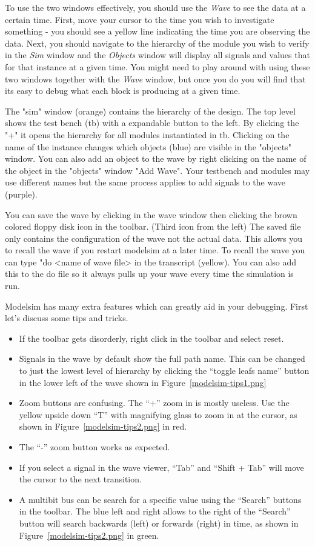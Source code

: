 \documentclass{article}
\begin{document}
To use the two windows effectively, you should use the \textit{Wave}
to see the data at a certain time.  First, move your cursor to the
time you wish to investigate something - you should see a yellow line
indicating the time you are observing the data.  Next, you
should navigate to the
hierarchy of the module you wish to verify in the \textit{Sim} window
and the \textit{Objects} window will display all signals and values
that for that instance at a given time.  You might need to play around
with using these two windows together with the \textit{Wave} window,
but once you do you will find that its easy to debug what each block
is producing at a given time.

The "sim" window (orange) contains the hierarchy of the design.  The
top level shows the test bench (tb) with a expandable button to the
left.
By clicking the "+" it opens the hierarchy for all modules
instantiated in tb.  Clicking on the name of the instance changes
which objects (blue) are visible in the "objects" window.  You can
also add an
object to the wave by right clicking on the name of the object in the
"objects" window "Add Wave".  Your testbench and modules may use
different names but the same process applies to add signals to the
wave (purple).

You can save the wave by clicking in the wave window then clicking the
brown colored floppy disk icon in the toolbar.  (Third icon from the
left)  The saved file only contains the configuration of the wave not
the actual data. This allows you to recall the wave if you restart
modelsim at a later time.  To recall the wave you can type "do <name
of wave file> in the transcript (yellow).  You can also add this to
the do file so it always pulls up your wave every time the simulation
is run.

Modelsim has many extra features which can greatly aid in your debugging.
First let's discuss some tips and tricks.
\begin{itemize}
\item  If the toolbar gets disorderly, right click in the toolbar and
  select reset.
\item Signals in the wave by default show the full path name.  This can
  be changed to just the lowest level of hierarchy by clicking the
  ``toggle leafs name'' button in the lower left of the wave shown in
  Figure~\ref{modelsim-tips1.png}  
\item Zoom buttons are confusing.  The ``+'' zoom in is mostly useless.
  Use the yellow upside down ``T'' with magnifying glass to zoom in
  at the cursor, as shown in Figure~\ref{modelsim-tips2.png} in red.
\item The ``-'' zoom button works as expected.
\item If you select a signal in the wave viewer, ``Tab'' and ``Shift + Tab''
  will move the cursor to the next transition.
\item A multibit bus can be search for a specific value using the ``Search''
  buttons in the toolbar.  The blue left and right allows to the right of
  the ``Search'' button will search backwards (left) or forwards (right)
  in time, as shown in Figure~\ref{modelsim-tips2.png} in green.
\end{itemize}
\end{document}
